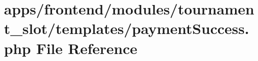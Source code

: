 \hypertarget{frontend_2modules_2tournament__slot_2templates_2payment_success_8php}{\section{apps/frontend/modules/tournament\-\_\-slot/templates/payment\-Success.php File Reference}
\label{frontend_2modules_2tournament__slot_2templates_2payment_success_8php}
}

